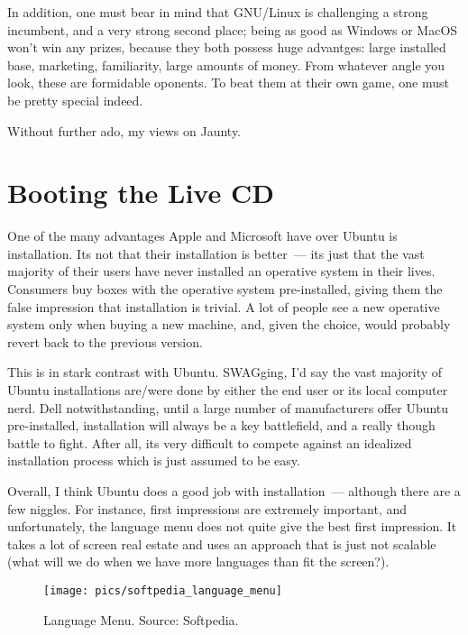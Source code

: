 \documentclass{memoir}
\begin{document}
In addition, one must bear in mind that GNU/Linux is challenging a
strong incumbent, and a very strong second place; being as good as
Windows or MacOS won't win any prizes, because they both possess huge
advantges: large installed base, marketing, familiarity, large amounts
of money. From whatever angle you look, these are formidable
oponents. To beat them at their own game, one must be pretty special
indeed.

Without further ado, my views on Jaunty.

\section{Booting the Live CD}

One of the many advantages Apple and Microsoft have over Ubuntu is
installation. Its not that their installation is better~--- its just
that the vast majority of their users have never installed an
operative system in their lives. Consumers buy boxes with the
operative system pre-installed, giving them the false impression that
installation is trivial. A lot of people see a new operative system
only when buying a new machine, and, given the choice, would probably
revert back to the previous version.

This is in stark contrast with Ubuntu. SWAGging, I'd say the vast
majority of Ubuntu installations are/were done by either the end user
or its local computer nerd. Dell notwithstanding, until a large number
of manufacturers offer Ubuntu pre-installed, installation will always
be a key battlefield, and a really though battle to fight. After all,
its very difficult to compete against an idealized installation
process which is just assumed to be easy.

Overall, I think Ubuntu does a good job with installation~--- although
there are a few niggles. For instance, first impressions are extremely
important, and unfortunately, the language menu does not quite give
the best first impression. It takes a lot of screen real estate and
uses an approach that is just not scalable (what will we do when we
have more languages than fit the screen?).

\begin{figure}
\begin{center}
\texttt{[image: pics/softpedia\_language\_menu]}
\end{center}
\caption{Language Menu. Source: Softpedia.}
\end{figure}
\end{document}
